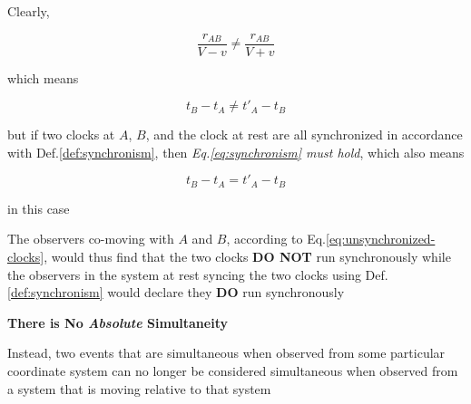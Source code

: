 \begin{tcolorbox}[
    enhanced,
    skin=enhancedlast jigsaw,interior hidden,
    boxsep=0pt,top=0pt,colframe=red,coltitle=red!50!black,
    attach boxed title to bottom center,
    boxed title style={empty,boxrule=0.5mm},
    varwidth boxed title=0.5\linewidth,
    underlay boxed title={
        \draw[white,line width=0.5mm]
        ([xshift=0.3mm-\tcboxedtitleheight*2,yshift=0.3mm]title.north west)
        --([xshift=-0.3mm+\tcboxedtitleheight*2,yshift=0.3mm]title.north east);
        \path[draw=red,top color=white,bottom color=red!50!white,line width=0.5mm]
        ([xshift=0.25mm-\tcboxedtitleheight*2,yshift=0.25mm]title.north west)
        cos +(\tcboxedtitleheight,-\tcboxedtitleheight/2)
        sin +(\tcboxedtitleheight,-\tcboxedtitleheight/2)
        -- ([xshift=0.25mm,yshift=0.25mm]title.south west)
        -- ([yshift=0.25mm]title.south east)
        cos +(\tcboxedtitleheight,\tcboxedtitleheight/2)
        sin +(\tcboxedtitleheight,\tcboxedtitleheight/2); },
    title=we have a contradiction,
    watermark graphics=烟绯-11.png,
    watermark opacity=0.3
]
    Clearly,

    \begin{equation}\label{eq:unsynchronized-clocks}
        \frac{r_{AB}}{V - v} \ne \frac{r_{AB}}{V + v}
    \end{equation}

    which means

    \[
        t_B - t_A \ne t'_A - t_B
    \]

    but if two clocks at $A$, $B$, and the clock at rest are all synchronized in accordance with Def.\ref{def:synchronism}, then \textit{Eq.\ref{eq:synchronism} must hold}, which also means

    \[
        t_B - t_A = t'_A - t_B
    \]

    in this case
\end{tcolorbox}

The observers co-moving with $A$ and $B$, according to Eq.\ref{eq:unsynchronized-clocks}, would thus find that the two
clocks \textbf{DO NOT} run synchronously while the observers in the system at rest syncing the two clocks using
Def.\ref{def:synchronism} would declare they \textbf{DO} run synchronously

\begin{tcolorbox}[
    colback=green!5!white,
    colframe=green!55!black,
    title=How do we resolve the contradiction?
]
    \begin{center}
        \textbf{There is No \textit{Absolute} Simultaneity}
    \end{center}

    Instead, two events that are simultaneous when observed from some particular coordinate system can no longer be
    considered simultaneous when observed from a system that is moving relative to that system
\end{tcolorbox}

